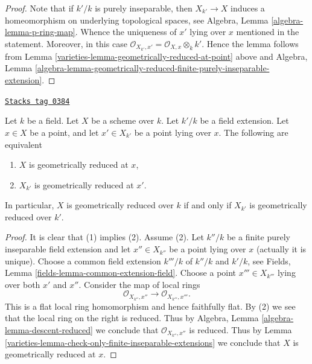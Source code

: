 \begin{proof}

Note that if $k'/k$ is purely inseparable, then
$X_{k'} \to X$ induces a homeomorphism on underlying topological
spaces, see Algebra, Lemma \ref{algebra-lemma-p-ring-map}.
Whence the uniqueness of $x'$ lying over $x$ mentioned in the
statement. Moreover, in this case
$\mathcal{O}_{X_{k'}, x'} = \mathcal{O}_{X, x} \otimes_k k'$.
Hence the lemma follows from Lemma \ref{varieties-lemma-geometrically-reduced-at-point}
above and Algebra, Lemma
\ref{algebra-lemma-geometrically-reduced-finite-purely-inseparable-extension}.
\end{proof}

\begin{lemma}
\label{varieties-lemma-geometrically-reduced-upstairs}
\href{https://stacks.math.columbia.edu/tag/0384}{\texttt{Stacks tag 0384}}

Let $k$ be a field.
Let $X$ be a scheme over $k$.
Let $k'/k$ be a field extension.
Let $x \in X$ be a point, and let $x' \in X_{k'}$ be a point lying over $x$.
The following are equivalent
\begin{enumerate}
\item $X$ is geometrically reduced at $x$,
\item $X_{k'}$ is geometrically reduced at $x'$.
\end{enumerate}
In particular, $X$ is geometrically reduced over $k$ if and only if
$X_{k'}$ is geometrically reduced over $k'$.
\end{lemma}

\begin{proof}

It is clear that (1) implies (2). Assume (2).
Let $k''/k$ be a finite purely inseparable field extension
and let $x'' \in X_{k''}$ be a point lying over $x$ (actually it is
unique). Choose a common field extension $k'''/k$ of $k''/k$ and $k'/k$, see
Fields, Lemma \ref{fields-lemma-common-extension-field}.
Choose a point $x''' \in X_{k'''}$ lying over both $x'$ and $x''$.
Consider the map of local rings
$$
\mathcal{O}_{X_{k''}, x''} \longrightarrow \mathcal{O}_{X_{k'''}, x'''}.
$$
This is a flat local ring homomorphism and hence faithfully flat.
By (2) we see that the local ring on the right is reduced.
Thus by Algebra, Lemma \ref{algebra-lemma-descent-reduced}
we conclude that $\mathcal{O}_{X_{k''}, x''}$ is reduced.
Thus by Lemma \ref{varieties-lemma-check-only-finite-inseparable-extensions}
we conclude that $X$ is geometrically reduced at $x$.
\end{proof}

